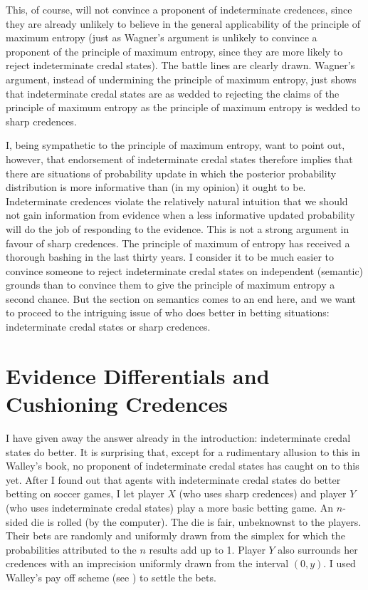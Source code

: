 \documentclass[11pt]{article}
\begin{document}
This, of course, will not convince a proponent of indeterminate
credences, since they are already unlikely to believe in the general
applicability of the principle of maximum entropy (just as Wagner's
argument is unlikely to convince a proponent of the principle of
maximum entropy, since they are more likely to reject indeterminate
credal states). The battle lines are clearly drawn. Wagner's argument,
instead of undermining the principle of maximum entropy, just shows
that indeterminate credal states are as wedded to rejecting the claims
of the principle of maximum entropy as the principle of maximum
entropy is wedded to sharp credences. 

I, being sympathetic to the principle of maximum entropy, want to
point out, however, that endorsement of indeterminate credal states
therefore implies that there are situations of probability update in
which the posterior probability distribution is more informative than
(in my opinion) it ought to be. Indeterminate credences violate the
relatively natural intuition that we should not gain information from
evidence when a less informative updated probability will do the job
of responding to the evidence. This is not a strong argument in favour
of sharp credences. The principle of maximum of entropy has received a
thorough bashing in the last thirty years. I consider it to be much
easier to convince someone to reject indeterminate credal states on
independent (semantic) grounds than to convince them to give the
principle of maximum entropy a second chance. But the section on
semantics comes to an end here, and we want to proceed to the
intriguing issue of who does better in betting situations:
indeterminate credal states or sharp credences.

\section{Evidence Differentials and Cushioning Credences} 
\label{WalleysWorldCupWoes}

I have given away the answer already in the introduction:
indeterminate credal states do better. It is surprising that, except
for a rudimentary allusion to this in Walley's book, no proponent of
indeterminate credal states has caught on to this yet. After I found
out that agents with indeterminate credal states do better betting on
soccer games, I let player $X$ (who uses sharp credences) and player
$Y$ (who uses indeterminate credal states) play a more basic betting
game. An $n$-sided die is rolled (by the computer). The die is fair,
unbeknownst to the players. Their bets are randomly and uniformly
drawn from the simplex for which the probabilities attributed to the
$n$ results add up to 1. Player $Y$ also surrounds her credences with
an imprecision uniformly drawn from the interval $(0,y)$. I used
Walley's pay off scheme (see ) to settle the
bets.
\end{document}
